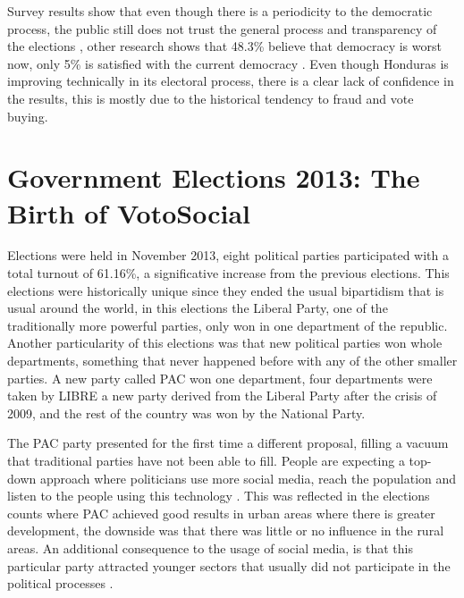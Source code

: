 \documentclass[a4paper,10pt]{article}
\begin{document}
Survey results show that even though there is a periodicity to the democratic process, the public still does not trust the general process and transparency of the elections \citep{romero2014}, other research shows that 48.3\% believe that democracy is worst now, only 5\% is satisfied with the current democracy \citep{latinbar}. Even though Honduras is improving technically in its electoral process, there is a clear lack of confidence in the results, this is mostly due to the historical tendency to fraud and vote buying.

\section{Government Elections 2013: The Birth of VotoSocial}

Elections were held in November 2013, eight political parties participated with a total turnout of 61.16\%, a significative increase from the previous elections. This elections were historically unique since they ended the usual bipartidism that is usual around the world, in this elections the Liberal Party, one of the traditionally more powerful parties, only won in one department of the republic. Another particularity of this elections was that new political parties won whole departments, something that never happened before with any of the other smaller parties. A new party called PAC won one department, four departments were taken by LIBRE a new party derived from the Liberal Party after the crisis of 2009, and the rest of the country was won by the National Party.

The PAC party presented for the first time a different proposal, filling a vacuum that traditional parties have not been able to fill. People are expecting a top-down approach where politicians use more social media, reach the population and listen to the people using this technology \citep{map2014}. This was reflected in the elections counts where PAC achieved good results in urban areas where there is greater development, the downside was that there was little or no influence in the rural areas. An additional consequence to the usage of social media, is that this particular party attracted younger sectors that usually did not participate in the political processes \citep{romero2014}.
\end{document}

